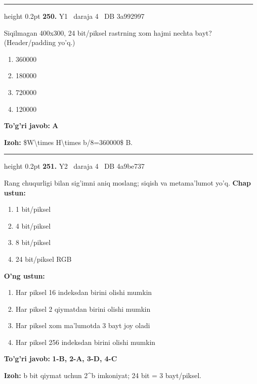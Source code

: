 \documentclass[10pt,a4paper,oneside]{article}
\begin{document}
\vspace{2mm}\hrule height 0.2pt \vspace{4mm}
\hypertarget{q250}{\textbf{\color{ink}250.}}  {\color{muted}\scriptsize Y1 \textbullet\ daraja 4 \textbullet\ DB 3a992997}
\par
Siqilmagan 400x300, 24 bit/piksel rastrning xom hajmi nechta bayt? (Header/padding yo'q.)
\begin{enumerate}[label=\Alph*),leftmargin=9mm]
\item 360000
\item 180000
\item 720000
\item 120000
\end{enumerate}
\begin{tcolorbox}[enhanced,breakable,colback=teal!4,colframe=teal!45!black,boxrule=0.45pt,arc=1.2mm,left=2.8mm,right=2.8mm,top=2mm,bottom=2mm,before skip=2mm,after skip=2mm]
\textbf{\color{teal}To'g'ri javob:} \textbf{A}
\par\smallskip
\textbf{Izoh:} \$W\textbackslash{}times H\textbackslash{}times b/8=360000\$ B.
\end{tcolorbox}
\vspace{2mm}\hrule height 0.2pt \vspace{4mm}
\hypertarget{q251}{\textbf{\color{ink}251.}}  {\color{muted}\scriptsize Y2 \textbullet\ daraja 4 \textbullet\ DB 4a9be737}
\par
Rang chuqurligi bilan sig'imni aniq moslang; siqish va metama'lumot yo'q.
\textbf{\footnotesize Chap ustun:}
\begin{enumerate}[label=\arabic*),leftmargin=9mm]
\item 1 bit/piksel
\item 4 bit/piksel
\item 8 bit/piksel
\item 24 bit/piksel RGB
\end{enumerate}
\textbf{\footnotesize O'ng ustun:}
\begin{enumerate}[label=\Alph*),leftmargin=9mm]
\item Har piksel 16 indeksdan birini olishi mumkin
\item Har piksel 2 qiymatdan birini olishi mumkin
\item Har piksel xom ma'lumotda 3 bayt joy oladi
\item Har piksel 256 indeksdan birini olishi mumkin
\end{enumerate}
\begin{tcolorbox}[enhanced,breakable,colback=teal!4,colframe=teal!45!black,boxrule=0.45pt,arc=1.2mm,left=2.8mm,right=2.8mm,top=2mm,bottom=2mm,before skip=2mm,after skip=2mm]
\textbf{\color{teal}To'g'ri javob:} \textbf{1-B, 2-A, 3-D, 4-C}
\par\smallskip
\textbf{Izoh:} b bit qiymat uchun 2\textasciicircum{}b imkoniyat; 24 bit = 3 bayt/piksel.
\end{tcolorbox}
\end{document}
